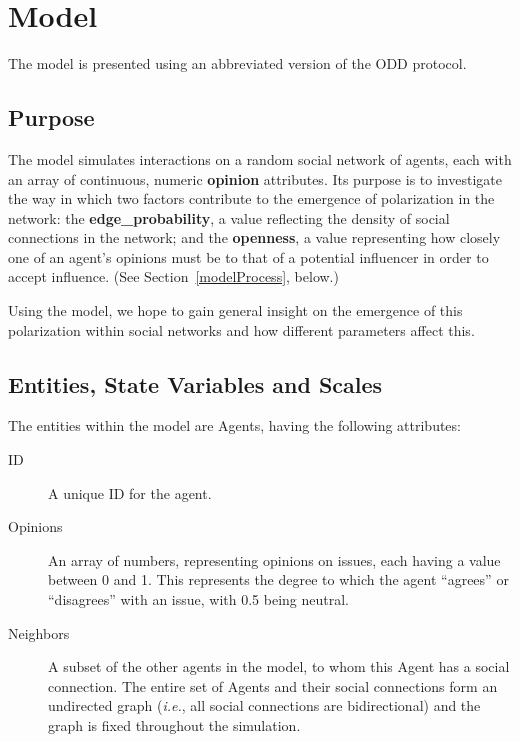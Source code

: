 \section{Model}

The model is presented using an abbreviated version of the ODD
protocol\cite{grimm_standard_2006}.

\subsection{Purpose}


The model simulates interactions on a random social network of agents, each
with an array of continuous, numeric \textbf{opinion} attributes. Its purpose
is to investigate the way in which two factors contribute to the emergence of
polarization in the network: the \textbf{edge\_probability}, a value reflecting
the density of social connections in the network; and the \textbf{openness}, a
value representing how closely one of an agent's opinions must be to that of a
potential influencer in order to accept influence. (See
Section~\ref{modelProcess}, below.)

Using the model, we hope to gain general insight on the emergence of this
polarization within social networks and how different parameters affect this.

\subsection{Entities, State Variables and Scales}

The entities within the model are Agents, having the following attributes:

\begin{description}
\item[ID] A unique ID for the agent.
\item[Opinions] An array of numbers, representing opinions on issues, each
having a value between 0 and 1. This represents the degree to which the agent
``agrees'' or ``disagrees'' with an issue, with 0.5 being neutral.
\item[Neighbors] A subset of the other agents in the model, to whom this Agent
has a social connection. The entire set of Agents and their social connections
form an undirected graph (\textit{i.e.}, all social connections are
bidirectional) and the graph is fixed throughout the simulation.

\end{description}


